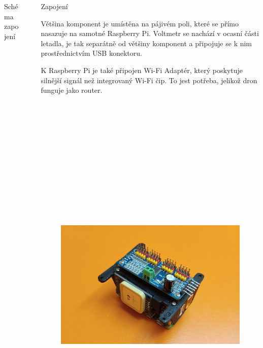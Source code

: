 \documentclass[final]{beamer}
\newlength{\sepwidth}
\newlength{\colwidth}
\newcommand{\separatorcolumn}{\begin{column}{\sepwidth}\end{column}}
\begin{document}
\begin{frame}[t]
\begin{columns}[t]
\begin{column}{\colwidth}
\begin{block}{Schéma zapojení}
      \end{block}

    \end{column}

    \separatorcolumn

    \begin{column}{\colwidth}

			\begin{block}{Zapojení}

				Většina komponent je umístěna na pájivém poli, které se přímo nasazuje na samotné Raspberry Pi.
				Voltmetr se nachází v ocasní části letadla, je tak separátně od většiny komponent a připojuje se k nim prostřednictvím USB konektoru.

				K Raspberry Pi je také připojen Wi-Fi Adaptér, který poskytuje silnější signál než integrovaný Wi-Fi čip.
				To jest potřeba, jelikož dron funguje jako router.

				\begin{figure}[h]
					\centering
					\includegraphics[height=19cm]{../img/detail.jpg}
				\end{figure}


\end{block}
\end{column}
\end{columns}
\end{frame}
\end{document}
